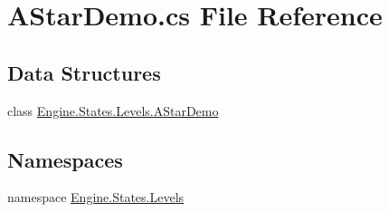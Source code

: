 \hypertarget{a00203}{}\section{A\+Star\+Demo.\+cs File Reference}
\label{a00203}
\subsection*{Data Structures}
\begin{DoxyCompactItemize}
\item 
class \hyperlink{a00562}{Engine.\+States.\+Levels.\+A\+Star\+Demo}
\end{DoxyCompactItemize}
\subsection*{Namespaces}
\begin{DoxyCompactItemize}
\item 
namespace \hyperlink{a00279}{Engine.\+States.\+Levels}
\end{DoxyCompactItemize}
